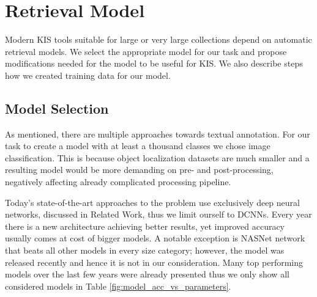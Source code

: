 \chapter{Retrieval Model}\label{chap:retrieval_model}
Modern KIS tools suitable for large or very large collections depend on automatic retrieval models. We select the appropriate model for our task and propose modifications needed for the model to be useful for KIS. We also describe steps how we created training data for our model.

\section{Model Selection}
As mentioned, there are multiple approaches towards textual annotation. For our task to create a model with at least a thousand classes we chose image classification. This is because object localization datasets are much smaller and a resulting model would be more demanding on pre- and post-processing, negatively affecting already complicated processing pipeline.

Today's state-of-the-art approaches to the problem use exclusively deep neural networks, discussed in Related Work, thus we limit ourself to DCNNs. Every year there is a new architecture achieving better results, yet improved accuracy usually comes at cost of bigger models. A notable exception is NASNet network~\cite{zoph2017learning} that beats all other models in every size category; however, the model was released recently and hence it is not in our consideration. Many top performing models over the last few years were already presented thus we only show all considered models in Table \ref{fig:model_acc_vs_parameters}.

